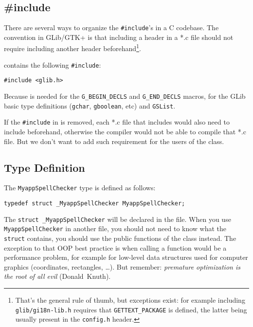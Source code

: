 \subsection{\#include}
\label{oop-semi-include-in-header}
There are several ways to organize the \lstinline{#include}'s in a C codebase. The convention in GLib/GTK+ is that including a header in a *.c file should not require including another header beforehand\footnote{That's the general rule of thumb, but exceptions exist: for example including \lstinline{glib/gi18n-lib.h} requires that \lstinline{GETTEXT_PACKAGE} is defined, the latter being usually present in the \lstinline{config.h} header.}.

 contains the following \lstinline{#include}:
\begin{lstlisting}
#include <glib.h>
\end{lstlisting}

Because  is needed for the \lstinline{G_BEGIN_DECLS} and \lstinline{G_END_DECLS} macros, for the GLib basic type definitions (\lstinline{gchar}, \lstinline{gboolean}, etc) and \lstinline{GSList}.

If the \lstinline{#include} in  is removed, each *.c file that includes  would also need to include  beforehand, otherwise the compiler would not be able to compile that *.c file. But we don't want to add such requirement for the users of the class.

\subsection{Type Definition}
The \lstinline{MyappSpellChecker} type is defined as follows:

\begin{lstlisting}
typedef struct _MyappSpellChecker MyappSpellChecker;
\end{lstlisting}

The \lstinline{struct _MyappSpellChecker} will be declared in the  file. When you use \lstinline{MyappSpellChecker} in another file, you should not need to know what the \lstinline{struct} contains, you should use the public functions of the class instead. The exception to that OOP best practice is when calling a function would be a performance problem, for example for low-level data structures used for computer graphics (coordinates, rectangles, …). But remember: \emph{premature optimization is the root of all evil} (Donald~Knuth).

